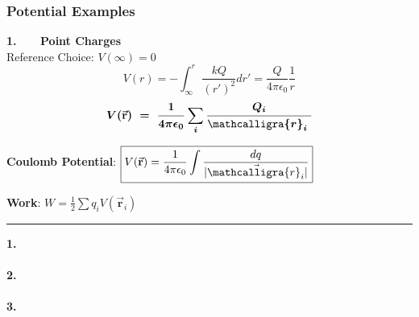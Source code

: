 \documentclass[12pt]{article}
\newcommand{\scripty}[1]{\ensuremath{\mathcalligra{#1}}}
\newcommand*{\cursr}{\scripty{r}}		%
\begin{document}
\subsubsection{Potential Examples}
\vspace{10pt}
\begin{minipage}[t]{0.5\textwidth}
	\textbf{1. \ \ \ Point Charges}\\[10pt]
	Reference Choice: \( V(\infty) = 0\)
	\[ V( r ) = - \int_{ \infty }^{r} \frac{k Q}{(r')^2} dr'
		= \frac{Q}{4 \pi \epsilon_0} \frac{1}{r} \]
	\[ \boldsymbol{ V(\vec{ \mathbf{r} }) \ 
		= \ \frac{1}{4 \pi \epsilon_0} \sum_i \frac{Q_i}{\cursr_i \ } } \]
	
	\vspace{20pt}
	\textbf{Coulomb Potential}: \indent 
	\( \displaystyle \boxed{ V(\vec{ \mathbf{r} }) 
		= \frac{1}{4 \pi \epsilon_0} \int \frac{dq}{| \vec{\cursr_i} |} }\)

	\vspace{20pt}
	\textbf{Work}: \indent 
	\( \displaystyle \boxed{ W = \frac{1}{2} \sum q_i V(\vec{ \mathbf{r} }_i) } \)
\end{minipage}
\rule[-438pt]{.5pt}{450pt}
\hspace{0.02\textwidth}
\begin{minipage}[t]{0.5\textwidth}
	\textbf{1. \ \ \ }\\ \\

	
	\hfill \break
	\textbf{2. \ \ \ }\\ \\

	\hfill \break
	\textbf{3. \ \ \ }\\ \\
	
\end{minipage}
\end{document}
